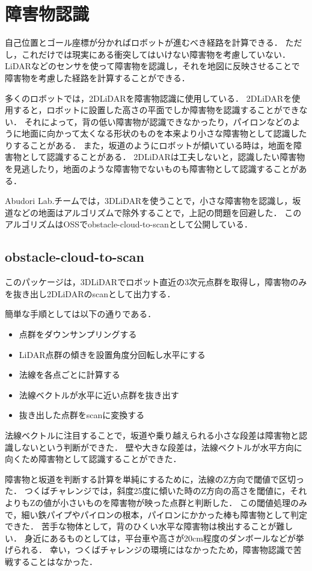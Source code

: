 \section{障害物認識}
自己位置とゴール座標が分かればロボットが進むべき経路を計算できる．
ただし，これだけでは現実にある衝突してはいけない障害物を考慮していない．
LiDARなどのセンサを使って障害物を認識し，それを地図に反映させることで障害物を考慮した経路を計算することができる．

多くのロボットでは，2DLiDARを障害物認識に使用している．
2DLiDARを使用すると，ロボットに設置した高さの平面でしか障害物を認識することができない．
それによって，背の低い障害物が認識できなかったり，パイロンなどのように地面に向かって太くなる形状のものを本来より小さな障害物として認識したりすることがある．
また，坂道のようにロボットが傾いている時は，地面を障害物として認識することがある．
2DLiDARは工夫しないと，認識したい障害物を見逃したり，地面のような障害物でないものも障害物として認識することがある．

Abudori Lab.チームでは，3DLiDARを使うことで，小さな障害物を認識し，坂道などの地面はアルゴリズムで除外することで，上記の問題を回避した．
このアルゴリズムはOSSでobstacle-cloud-to-scan\cite{obstacle}として公開している．

\subsection{obstacle-cloud-to-scan}
このパッケージは，3DLiDARでロボット直近の3次元点群を取得し，障害物のみを抜き出し2DLiDARのscanとして出力する．

簡単な手順としては以下の通りである．
\begin{itemize}
    \item 点群をダウンサンプリングする
    \item LiDAR点群の傾きを設置角度分回転し水平にする
    \item 法線を各点ごとに計算する
    \item 法線ベクトルが水平に近い点群を抜き出す
    \item 抜き出した点群をscanに変換する
\end{itemize}

法線ベクトルに注目することで，坂道や乗り越えられる小さな段差は障害物と認識しないという判断ができた．
壁や大きな段差は，法線ベクトルが水平方向に向くため障害物として認識することができた．

障害物と坂道を判断する計算を単純にするために，法線のZ方向で閾値で区切った．
つくばチャレンジでは，斜度25度に傾いた時のZ方向の高さを閾値に，それよりもZの値が小さいものを障害物が映った点群と判断した．
この閾値処理のみで，細い鉄パイプやパイロンの根本，パイロンにかかった棒も障害物として判定できた．
苦手な物体として，背のひくい水平な障害物は検出することが難しい．
身近にあるものとしては，平台車や高さが20cm程度のダンボールなどが挙げられる．
幸い，つくばチャレンジの環境にはなかったため，障害物認識で苦戦することはなかった．

